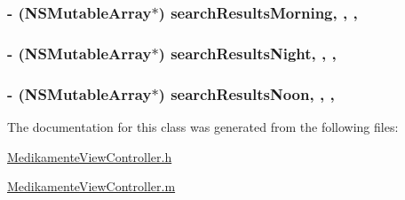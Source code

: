 \subsubsection[{search\+Results\+Morning}]{\setlength{\rightskip}{0pt plus 5cm}-\/ (N\+S\+Mutable\+Array$\ast$) search\+Results\+Morning\hspace{0.3cm}{\ttfamily [read]}, {\ttfamily [write]}, {\ttfamily [nonatomic]}, {\ttfamily [strong]}}\label{interface_medikamente_view_controller_a8c48c666e67949f34068e8578406fad6}
\hypertarget{interface_medikamente_view_controller_ad9f3fd6d4a9c491e79f7a2a56d0c40ef}{}
\subsubsection[{search\+Results\+Night}]{\setlength{\rightskip}{0pt plus 5cm}-\/ (N\+S\+Mutable\+Array$\ast$) search\+Results\+Night\hspace{0.3cm}{\ttfamily [read]}, {\ttfamily [write]}, {\ttfamily [nonatomic]}, {\ttfamily [strong]}}\label{interface_medikamente_view_controller_ad9f3fd6d4a9c491e79f7a2a56d0c40ef}
\hypertarget{interface_medikamente_view_controller_a5ffb2b731a04e9ddbf394fb56694e8df}{}
\subsubsection[{search\+Results\+Noon}]{\setlength{\rightskip}{0pt plus 5cm}-\/ (N\+S\+Mutable\+Array$\ast$) search\+Results\+Noon\hspace{0.3cm}{\ttfamily [read]}, {\ttfamily [write]}, {\ttfamily [nonatomic]}, {\ttfamily [strong]}}\label{interface_medikamente_view_controller_a5ffb2b731a04e9ddbf394fb56694e8df}


The documentation for this class was generated from the following files\+:\begin{DoxyCompactItemize}
\item 
\hyperlink{_medikamente_view_controller_8h}{Medikamente\+View\+Controller.\+h}\item 
\hyperlink{_medikamente_view_controller_8m}{Medikamente\+View\+Controller.\+m}\end{DoxyCompactItemize}

